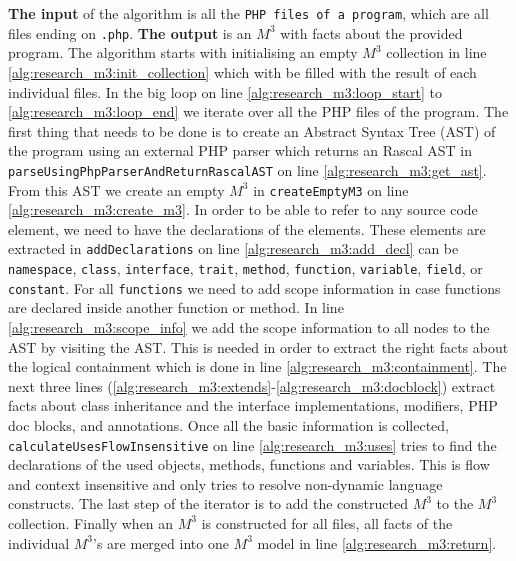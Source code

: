 \documentclass[../main.tex]{subfiles}
\begin{document}
	\textbf{The input} of the algorithm is all the \texttt{PHP files of a program}, which are all files ending on \texttt{.php}.
    \textbf{The output} is an $M^3$ with facts about the provided program.
    The algorithm starts with initialising an empty $M^3$ collection in line \ref{alg:research_m3:init_collection} which with be filled with the result of each individual files.
    In the big loop on line \ref{alg:research_m3:loop_start} to \ref{alg:research_m3:loop_end} we iterate over all the PHP files of the program.
    The first thing that needs to be done is to create an Abstract Syntax Tree (\gls{AST}) of the program using an external PHP parser\footnotemark{} which returns an Rascal AST in \texttt{parseUsingPhpParserAndReturnRascalAST} on line \ref{alg:research_m3:get_ast}.
    From this AST we create an empty $M^3$ in \texttt{createEmptyM3} on line \ref{alg:research_m3:create_m3}.
    In order to be able to refer to any source code element, we need to have the declarations of the elements.
    These elements are extracted in \texttt{addDeclarations} on line \ref{alg:research_m3:add_decl} can be \texttt{namespace}, \texttt{class}, \texttt{interface}, \texttt{trait}, \texttt{method},  \texttt{function}, \texttt{variable}, \texttt{field}, or \texttt{constant}.
    For all \texttt{functions} we need to add scope information in case functions are declared inside another function or method.
    In line \ref{alg:research_m3:scope_info} we add the scope information to all nodes to the AST by visiting the AST.
    This is needed in order to extract the right facts about the logical containment which is done in line \ref{alg:research_m3:containment}.
    The next three lines (\ref{alg:research_m3:extends}-\ref{alg:research_m3:docblock}) extract facts about class inheritance and the interface implementations, modifiers, PHP doc blocks, and annotations.
   	Once all the basic information is collected, \texttt{calculateUsesFlowInsensitive} on line \ref{alg:research_m3:uses} tries to find the declarations of the used objects, methods, functions and variables.
   	This is flow and context insensitive and only tries to resolve non-dynamic language constructs.
   	The last step of the iterator is to add the constructed $M^3$ to the $M^3$ collection.
   	Finally when an $M^3$ is constructed for all files, all facts of the individual $M^3$'s are merged into one $M^3$ model in line \ref{alg:research_m3:return}. 
    	    
\end{document}
